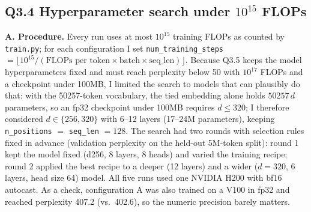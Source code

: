 \documentclass[11pt]{article}
\begin{document}
\subsection*{Q3.4 Hyperparameter search under $10^{15}$ FLOPs}
\textbf{A. Procedure.} Every run uses at most $10^{15}$ training FLOPs as counted by \texttt{train.py}; for each configuration I set \texttt{num\_training\_steps} $=\lfloor 10^{15} / (\text{FLOPs per token} \times \text{batch} \times \text{seq\_len}) \rfloor$. Because Q3.5 keeps the model hyperparameters fixed and must reach perplexity below 50 with $10^{17}$ FLOPs and a checkpoint under 100MB, I limited the search to models that can plausibly do that: with the 50257-token vocabulary, the tied embedding alone holds $50257\,d$ parameters, so an fp32 checkpoint under 100MB requires $d \le 320$; I therefore considered $d \in \{256, 320\}$ with 6--12 layers (17--24M parameters), keeping \texttt{n\_positions} $=$ \texttt{seq\_len} $=128$. The search had two rounds with selection rules fixed in advance (validation perplexity on the held-out 5M-token split): round 1 kept the model fixed (d256, 8 layers, 8 heads) and varied the training recipe; round 2 applied the best recipe to a deeper (12 layers) and a wider ($d=320$, 6 layers, head size 64) model. All five runs used one NVIDIA H200 with bf16 autocast. As a check, configuration A was also trained on a V100 in fp32 and reached perplexity 407.2 (vs.\ 402.6), so the numeric precision barely matters.
\end{document}
